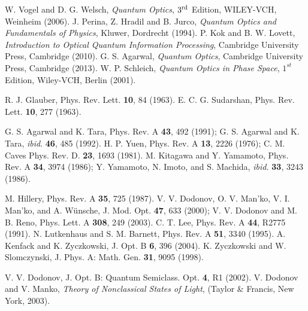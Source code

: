 \documentclass[letter,scriptaddress,twocolumn,prl,showkeys]{revtex4}
\begin{document}
\begin{thebibliography}{}


 W. Vogel and D. G. Welsch, {\it Quantum Optics}, $3^{\rm{rd}}$ Edition, WILEY-VCH, Weinheim (2006).
 J. Perina, Z. Hradil and B. Jurco, {\em Quantum Optics and Fundamentals of Physics}, Kluwer, Dordrecht (1994).
 P. Kok and B. W. Lovett, {\em Introduction to Optical Quantum Information Processing}, Cambridge University Press, Cambridge (2010).
 G. S. Agarwal, {\em Quantum Optics}, Cambridge University Press, Cambridge (2013).
 W. P. Schleich, {\em Quantum Optics in Phase Space}, $1^{st}$ Edition, Wiley-VCH, Berlin (2001).

 R. J. Glauber, Phys. Rev. Lett. {\bf 10}, 84 (1963).
 E. C. G. Sudarshan, Phys. Rev. Lett. {\bf 10}, 277 (1963).

 G. S. Agarwal and K. Tara, Phys. Rev. A {\bf 43}, 492 (1991); G. S. Agarwal and K. Tara, {\em ibid}. {\bf 46}, 485 (1992).
 H. P. Yuen, Phys. Rev. A {\bf 13}, 2226 (1976); C. M. Caves Phys. Rev. D. {\bf 23}, 1693 (1981).
 M. Kitagawa and Y. Yamamoto, Phys. Rev. A {\bf 34}, 3974 (1986); Y. Yamamoto, N. Imoto, and S. Machida, {\em ibid.} {\bf 33}, 3243 (1986).

 M. Hillery, Phys. Rev. A {\bf 35}, 725 (1987).
 V. V. Dodonov, O. V. Man'ko, V. I. Man'ko, and A. W\"unsche, J. Mod. Opt. \textbf{47}, 633 (2000); V. V. Dodonov and M. B. Reno, Phys. Lett. A {\bf 308}, 249 (2003).
 C. T. Lee, Phys. Rev. A {\bf 44}, R2775 (1991).
 N. Lutkenhaus and S. M. Barnett, Phys. Rev. A \textbf{51}, 3340 (1995).
 A. Kenfack and K. Zyczkowski, J. Opt. B \textbf{6}, 396 (2004).
 K. Zyczkowski and W. Slomczynski, J. Phys. A: Math. Gen. {\bf 31}, 9095 (1998).

 V. V. Dodonov, J. Opt. B: Quantum Semiclass. Opt. {\bf 4}, R1 (2002). 
 V. Dodonov and V. Manko, {\it Theory of Nonclassical States of Light}, (Taylor $\&$ Francis, New York, 2003).


\end{thebibliography}
\end{document}
